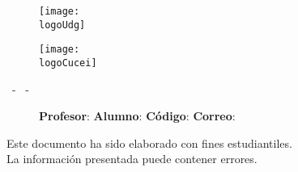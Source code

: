 



    \begin{titlepage}
        \centering
        {\huge\textbf{\universidad}}\par
        \vspace{0.6cm}
        {\LARGE{\cede}}
        \vfill

        \begin{figure}[h]
            \begin{minipage}[t]{0.45\textwidth}
                \centering
                \texttt{[image: \\logoUdg]}
            \end{minipage}
            \hfill
            \begin{minipage}[t]{0.45\textwidth}
                \centering
                \texttt{[image: \\logoCucei]}
            \end{minipage}
        \end{figure}
        \vfill

        \Large{
			\division\vfill
			\textbf{\carrera}\vfill
			\textbf{\materia}
			\par\vspace{3pt}
			\seccion\ - \clave\ - \nrc\vfill
		}

        {\LARGE{\textbf{\theTitle}}}
        \vfill

        \begin{figure}[h]
            \centering
            \begin{minipage}[t]{0.61\textwidth}
                {\Large
					\textbf{Profesor}: \profesor\nl
					\textbf{Alumno}: \theAuthor\nl
					\textbf{Código}: \theAuthorCode\nl
					\textbf{Correo}: \theAuthorMail
				}
            \end{minipage}
        \end{figure}
        \vfill

        \begin{tcolorbox}
            [colback=red!5!white, colframe=red!75!black]
            \centering
			Este documento ha sido elaborado con fines estudiantiles.\\
			La información presentada puede contener errores.
        \end{tcolorbox}
        \vfill
        {\large \startDate}\par
    \end{titlepage}

